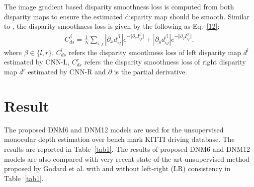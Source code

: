 \documentclass[10pt,twocolumn,letterpaper]{article}
\begin{document}
The image gradient based disparity smoothness loss is computed from both disparity maps to ensure the estimated disparity map should be smooth. Similar to \cite{Godard2017Unsupervised}, the disparity smoothness loss is given by the following as Eq.~\ref{12}:
\begin{equation}\label{12}
\begin{split}
C^\beta_{ds}=\frac{1}{N}\sum_{i,j}|\partial_xd^\beta_{ij}|e^{-\Vert\partial_xI^\beta_{ij}\Vert}+|\partial_yd^\beta_{ij}|e^{-\Vert\partial_yI^\beta_{ij}\Vert}.
\end{split}
\end{equation}
where $\beta\in\{l,r\}$, $C^l_{ds}$ refers the disparity smoothness loss of left disparity map $d^l$ estimated by CNN-L, $C^r_{ds}$ refers the disparity smoothness loss of right disparity map $d^r$ estimated by CNN-R and $\partial$ is the partial derivative.
\section{Result}
The proposed DNM6 and DNM12 models are used for the unsupervised monocular depth estimation over bench mark KITTI driving database. The results are reported in Table~\ref{tab1}. The results of proposed DNM6 and DNM12 models are also compared with very recent state-of-the-art unsupervised method proposed by Godard et al.\cite{Godard2017Unsupervised} with and without left-right (LR) consistency in
Table~\ref{tab1}.
{\small


}
\end{document}
